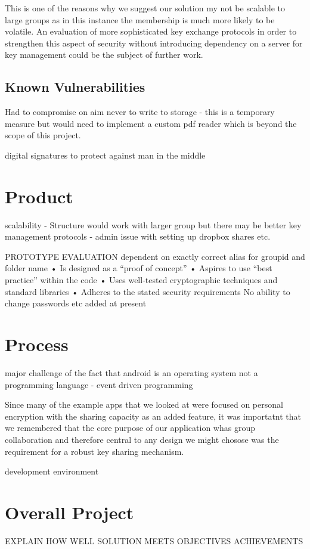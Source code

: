 This is one of the reasons why we suggest our solution my not be scalable to large groups as in this instance the membership is much more likely to be volatile.  An evaluation of more sophisticated key exchange protocols in order to strengthen this aspect of security without introducing dependency on a server for key management could be the subject of further work. 



\subsection*{Known Vulnerabilities}
Had to compromise on aim never to write to storage - this is a temporary measure but would need to implement a custom pdf reader which is beyond the scope of this project. 

 digital signatures to protect against man in the middle 
 
\section{Product}
scalability - Structure would work with larger group but there may be better key management protocols - admin issue with setting up dropbox shares etc.

PROTOTYPE EVALUATION
dependent on exactly correct alias for groupid and folder name
• Is designed as a “proof of concept”
• Aspires to use “best practice” within the code 
• Uses well-tested cryptographic techniques and standard libraries
• Adheres to the stated security requirements 
No ability to change passwords etc added at present
\section{Process}
major challenge of the fact that android is an operating system not a programming language - event driven programming

Since many of the example apps that we looked at were focused on personal encryption with the sharing capacity as an added feature, it was importatnt that we remembered that the core purpose of our application whas group collaboration and therefore central to any design we might chosose was the requirement for a robust key sharing mechanism.

development environment

\section{Overall Project}
EXPLAIN HOW WELL SOLUTION MEETS OBJECTIVES
ACHIEVEMENTS

